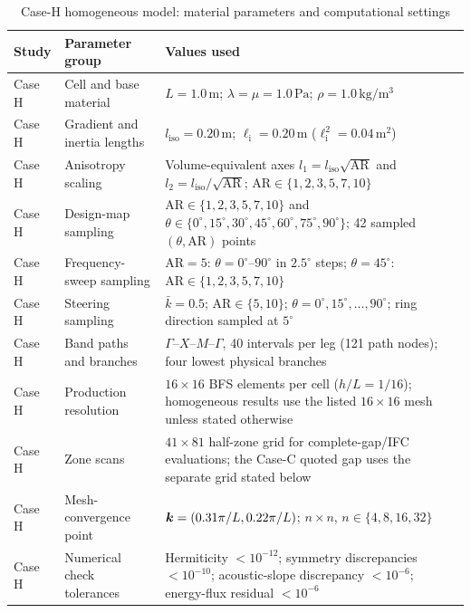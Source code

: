 \begin{table}[p]
\centering
\caption{Case-H homogeneous model: material parameters and computational settings}
\label{tab:s1_parameters}
\footnotesize
\renewcommand{\arraystretch}{1.18}
\begin{tabular}{@{}p{}p{}p{}@{}}
\toprule
Study & Parameter group & Values used \\
\midrule
Case H & Cell and base material & $L=1.0\,\mathrm{m}$; $\lambda=\mu=1.0\,\mathrm{Pa}$; $\rho=1.0\,\mathrm{kg/m^3}$ \\
Case H & Gradient and inertia lengths & $l_{\mathrm{iso}}=0.20\,\mathrm{m}$; $\ell_{\mathrm{i}}=0.20\,\mathrm{m}$ ($\ell_{\mathrm{i}}^2=0.04\,\mathrm{m^2}$) \\
Case H & Anisotropy scaling & Volume-equivalent axes $l_1=l_{\mathrm{iso}}\sqrt{\mathrm{AR}}$ and $l_2=l_{\mathrm{iso}}/\sqrt{\mathrm{AR}}$; $\mathrm{AR}\in\{1,2,3,5,7,10\}$ \\
Case H & Design-map sampling & $\mathrm{AR}\in\{1,2,3,5,7,10\}$ and $\theta\in\{0^\circ,15^\circ,30^\circ,45^\circ,60^\circ,75^\circ,90^\circ\}$; 42 sampled $(\theta,\mathrm{AR})$ points \\
Case H & Frequency-sweep sampling & $\mathrm{AR}=5$: $\theta=0^\circ$--$90^\circ$ in $2.5^\circ$ steps; $\theta=45^\circ$: $\mathrm{AR}\in\{1,2,3,5,7,10\}$ \\
Case H & Steering sampling & $\bar{k}=0.5$; $\mathrm{AR}\in\{5,10\}$; $\theta=0^\circ,15^\circ,\ldots,90^\circ$; ring direction sampled at $5^\circ$ \\
Case H & Band paths and branches & $\Gamma$--$X$--$M$--$\Gamma$, 40 intervals per leg (121 path nodes); four lowest physical branches \\
Case H & Production resolution & $16\times16$ BFS elements per cell ($h/L=1/16$); homogeneous results use the listed $16\times16$ mesh unless stated otherwise \\
Case H & Zone scans & $41\times81$ half-zone grid for complete-gap/IFC evaluations; the Case-C quoted gap uses the separate grid stated below \\
Case H & Mesh-convergence point & $\bm{k}=(0.31\pi/L,0.22\pi/L)$; $n\times n$, $n\in\{4,8,16,32\}$ \\
Case H & Numerical check tolerances & Hermiticity $<10^{-12}$; symmetry discrepancies $<10^{-10}$; acoustic-slope discrepancy $<10^{-6}$; energy-flux residual $<10^{-6}$ \\
\bottomrule
\end{tabular}
\end{table}

